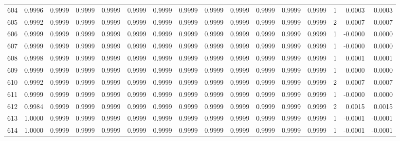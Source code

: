 \begin{tabular}{lrrrrrrrrrrrrrrr}
604 &      0.9996 &  0.9999 &  0.9999 &  0.9999 &  0.9999 &  0.9999 &  0.9999 &  0.9999 &  0.9999 &  0.9999 &   0.9999 &     0.9999 &      1 &                    0.0003 &                     0.0003 \\
605 &      0.9992 &  0.9999 &  0.9999 &  0.9999 &  0.9999 &  0.9999 &  0.9999 &  0.9999 &  0.9999 &  0.9999 &   0.9999 &     0.9999 &      2 &                    0.0007 &                     0.0007 \\
606 &      0.9999 &  0.9999 &  0.9999 &  0.9999 &  0.9999 &  0.9999 &  0.9999 &  0.9999 &  0.9999 &  0.9999 &   0.9999 &     0.9999 &      1 &                   -0.0000 &                     0.0000 \\
607 &      0.9999 &  0.9999 &  0.9999 &  0.9999 &  0.9999 &  0.9999 &  0.9999 &  0.9999 &  0.9999 &  0.9999 &   0.9999 &     0.9999 &      1 &                   -0.0000 &                     0.0000 \\
608 &      0.9998 &  0.9999 &  0.9999 &  0.9999 &  0.9999 &  0.9999 &  0.9999 &  0.9999 &  0.9999 &  0.9999 &   0.9999 &     0.9999 &      1 &                    0.0001 &                     0.0001 \\
609 &      0.9999 &  0.9999 &  0.9999 &  0.9999 &  0.9999 &  0.9999 &  0.9999 &  0.9999 &  0.9999 &  0.9999 &   0.9999 &     0.9999 &      1 &                   -0.0000 &                     0.0000 \\
610 &      0.9992 &  0.9999 &  0.9999 &  0.9999 &  0.9999 &  0.9999 &  0.9999 &  0.9999 &  0.9999 &  0.9999 &   0.9999 &     0.9999 &      2 &                    0.0007 &                     0.0007 \\
611 &      0.9999 &  0.9999 &  0.9999 &  0.9999 &  0.9999 &  0.9999 &  0.9999 &  0.9999 &  0.9999 &  0.9999 &   0.9999 &     0.9999 &      1 &                   -0.0000 &                     0.0000 \\
612 &      0.9984 &  0.9999 &  0.9999 &  0.9999 &  0.9999 &  0.9999 &  0.9999 &  0.9999 &  0.9999 &  0.9999 &   0.9999 &     0.9999 &      2 &                    0.0015 &                     0.0015 \\
613 &      1.0000 &  0.9999 &  0.9999 &  0.9999 &  0.9999 &  0.9999 &  0.9999 &  0.9999 &  0.9999 &  0.9999 &   0.9999 &     0.9999 &      1 &                   -0.0001 &                    -0.0001 \\
614 &      1.0000 &  0.9999 &  0.9999 &  0.9999 &  0.9999 &  0.9999 &  0.9999 &  0.9999 &  0.9999 &  0.9999 &   0.9999 &     0.9999 &      1 &                   -0.0001 &                    -0.0001 \\

\end{tabular}

